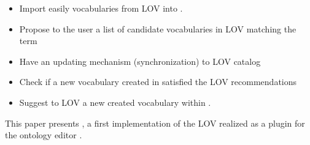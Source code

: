 \begin{itemize}
\item Import easily vocabularies from LOV into \protege. 
\item Propose to the user a list of candidate vocabularies in LOV matching the term
\item Have an updating mechanism (synchronization) to LOV catalog
\item Check if a new vocabulary created in \protege satisfied the LOV recommendations \cite{pybernard12}

\item Suggest to LOV a new created vocabulary within \protege.
\end{itemize}

This paper presents \protege, a first implementation of the LOV realized as a plugin for the ontology editor \protege. 
 
